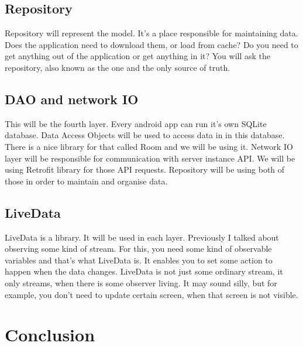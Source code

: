 \subsection{Repository}
Repository will represent the model.
It's a place responsible for maintaining data.
Does the application need to download them, or load from cache?
Do you need to get anything out of the application or get anything in it?
You will ask the repository, also known as the one and the only source of truth.

\subsection{DAO and network IO}
This will be the fourth layer.
Every android app can run it's own SQLite database.
Data Access Objects will be used to access data in in this database.
There is a nice library for that called Room and we will be using it.
Network IO layer will be responsible for communication with server instance API.
We will be using Retrofit library for those API requests.
Repository will be using both of those in order to maintain and organise data.

\subsection{LiveData}
LiveData is a library.
It will be used in each layer.
Previously I talked about observing some kind of stream.
For this, you need some kind of observable variables and that's what LiveData is.
It enables you to set some action to happen when the data changes.
LiveData is not just some ordinary stream, it only streams, when there is some observer living.
It may sound silly, but for example, you don't need to update certain screen, when that screen is not visible.

\section{Conclusion}

